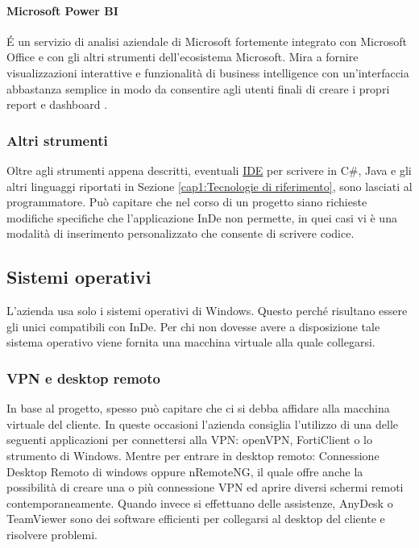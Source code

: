 \paragraph{Microsoft Power BI}
\'E un servizio di analisi aziendale di Microsoft fortemente integrato con Microsoft Office e con gli altri strumenti dell'ecosistema Microsoft. Mira a fornire visualizzazioni interattive e funzionalità di business intelligence con un'interfaccia abbastanza semplice in modo da consentire agli utenti finali di creare i propri report e dashboard \hyperref[bib10]{\cite{[10]}}.

\subsubsection*{Altri strumenti}
Oltre agli strumenti appena descritti, eventuali \hyperref[IDE]{IDE} per scrivere in C\#, Java e gli altri linguaggi riportati in Sezione \ref{cap1:Tecnologie di riferimento}, sono lasciati al programmatore. Può capitare che nel corso di un progetto siano richieste  modifiche specifiche che l'applicazione InDe non permette, in quei casi vi è una modalità di inserimento personalizzato che consente di scrivere codice.



\subsection{Sistemi operativi}
\label{cap1:Sistemi operativi}

L'azienda usa  solo i sistemi operativi di Windows. Questo perché risultano essere gli unici compatibili con InDe. Per chi non dovesse avere a disposizione tale sistema operativo viene fornita una macchina virtuale alla quale collegarsi. 

\subsubsection*{VPN e desktop remoto}
In base al progetto, spesso può capitare che ci si debba affidare alla macchina virtuale del cliente. In queste occasioni l'azienda consiglia l'utilizzo di una delle seguenti applicazioni per connettersi alla VPN: openVPN, FortiClient o lo strumento di Windows. 
Mentre per entrare in desktop remoto: Connessione Desktop Remoto di windows oppure nRemoteNG, il quale offre anche la possibilità di creare una o più connessione VPN ed aprire diversi schermi remoti contemporaneamente. 
Quando invece si effettuano delle assistenze, AnyDesk o TeamViewer sono dei software efficienti per collegarsi al desktop del cliente e risolvere problemi.


